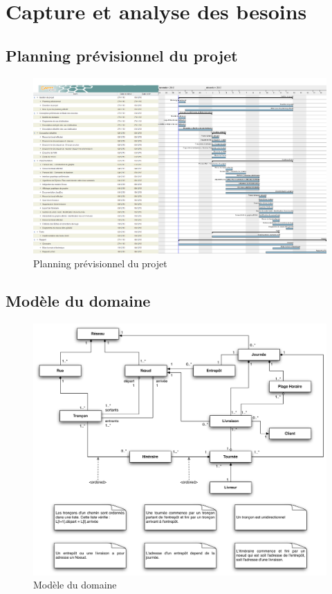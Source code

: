 \chapter{Capture et analyse des besoins}

\begin{landscape}
\section{Planning pr\'evisionnel du projet}

\begin{figure}[h]
    \centering
    \includegraphics[width=190mm]{../diagrams/project_management/planning_previsionnel/planning_previsionnel.png}
    \caption{Planning pr\'evisionnel du projet}
    \label{diagram:planning_prevision}
\end{figure}
\end{landscape}
\pagebreak


\section{Mod\`ele du domaine}

\begin{figure}[h]
    \centering
    \includegraphics[width=140mm]{../diagrams/domain_model/domaine.png}
    \caption{Mod\`ele du domaine}
    \label{diagram:domaine}
\end{figure}

